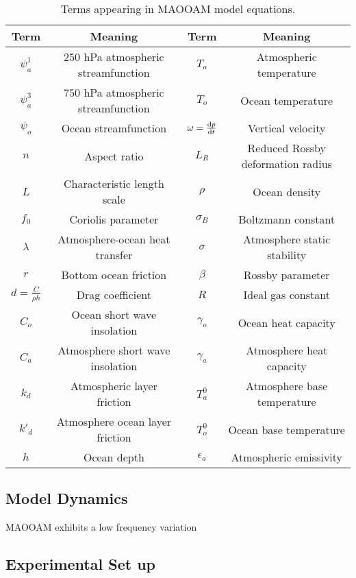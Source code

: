 \begin{table}
\begin{center}
{\begin{tabular}{ |c c c c| } 
 \hline
 Term & Meaning & Term & Meaning \\
 \hline
 $\psi_a^1$ & $250$ hPa atmospheric streamfunction & $T_a$ & Atmospheric temperature  \\ 
 $ \psi_a^3$ & $750$ hPa atmospheric streamfunction & $T_o$ & Ocean temperature  \\ 
 $\psi_o$ & Ocean streamfunction & $\omega = \dv{p}{t}$ & Vertical velocity  \\ 
 $n$ & Aspect ratio & $L_R$ & Reduced Rossby deformation radius  \\ 
 $L$ & Characteristic length scale & $\rho$ & Ocean density  \\ 
 $f_0$ & Coriolis parameter & $\sigma _B$ & Boltzmann constant  \\ 
 $\lambda$ & Atmosphere-ocean heat transfer & $\sigma$ & Atmosphere static stability  \\ 
 $r$ & Bottom ocean friction & $\beta$ & Rossby parameter  \\ 
 $d = \frac{C}{\rho h}$ & Drag coefficient & $R$ & Ideal gas constant  \\ 
 $C_o$ & Ocean short wave insolation & $\gamma_o$ & Ocean heat capacity  \\ 
 $C_a$ & Atmosphere short wave insolation & $\gamma_a$ & Atmosphere heat capacity  \\ 
 $k_d$ & Atmospheric layer friction & $T_a^0$ & Atmosphere base temperature  \\ 
 $k'_d$ & Atmosphere ocean layer friction & $T_o ^0$ & Ocean base temperature  \\ 
 $h$ & Ocean depth & $\epsilon_a $ & Atmospheric emissivity  \\ 
 \hline
\end{tabular}}
\end{center}
\caption{Terms appearing in MAOOAM model equations.} \label{MAOOAM Table}
\label{table:1}
\end{table}

\subsection{Model Dynamics}

MAOOAM exhibits a low frequency variation \cite{Vannitsem2015} \cite{Vannitsem2015a}

\subsection{Experimental Set up}